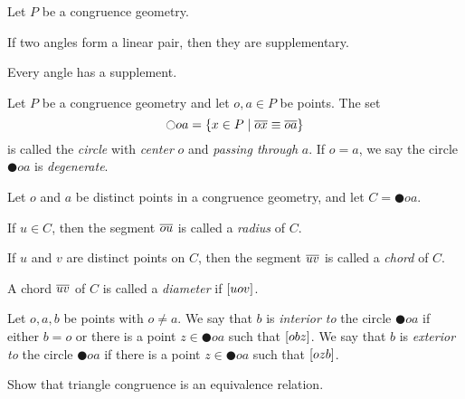 \begin{prop}
Let \(P\) be a congruence geometry.
\begin{proplist}
\item If two angles form a linear pair, then they are supplementary.
\item Every angle has a supplement.
\end{proplist}
\end{prop}


\begin{dfn}[Circle]
Let \(P\) be a congruence geometry and let \(o,a \in P\) be points.
The set \[ \ocircle{oa} = \{ x \in P \mid \overline{ox} \equiv \overline{oa} \} \] is called the \emph{circle} with \emph{center} \(o\) and \emph{passing through} \(a\).
If \(o = a\), we say the circle \(\CIRCLE{o}{a}\) is \emph{degenerate}.
\end{dfn}


\begin{dfn}
Let \(o\) and \(a\) be distinct points in a congruence geometry, and let \(C = \CIRCLE{o}{a}\).
\begin{proplist}
\item If \(u \in C\), then the segment \(\overline{ou}\) is called a \emph{radius} of \(C\).
\item If \(u\) and \(v\) are distinct points on \(C\), then the segment \(\overline{uv}\) is called a \emph{chord} of \(C\).
\item A chord \(\overline{uv}\) of \(C\) is called a \emph{diameter} if \([ u o v ]\).
\end{proplist}
\end{dfn}

\begin{dfn}
Let \(o,a,b\) be points with \(o \neq a\).
We say that \(b\) is \emph{interior to} the circle \(\CIRCLE{o}{a}\) if either \(b = o\) or there is a point \(z \in \CIRCLE{o}{a}\) such that \([ o b z ]\).
We say that \(b\) is \emph{exterior to} the circle \(\CIRCLE{o}{a}\) if there is a point \(z \in \CIRCLE{o}{a}\) such that \([ o z b ]\).
\end{dfn}



\Exercises%

\begin{exercise}
Show that triangle congruence is an equivalence relation.
\end{exercise}

